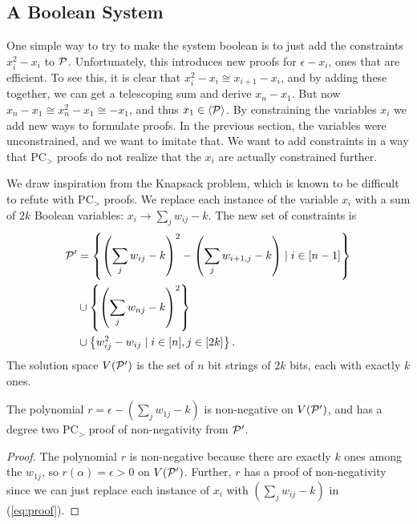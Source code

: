 \subsection{A Boolean System}
One simple way to try to make the system boolean is to just add the constraints $x_i^2 - x_i$ to $\mathcal P$. Unfortunately, this introduces new proofs for $\epsilon - x_i$, ones that are efficient. To see this, it is clear that $x_i^2 - x_i \cong x_{i+1} - x_i$, and by adding these together, we can get a telescoping sum and derive $x_n - x_1$. But now $x_n - x_1 \cong x_n^2 - x_1 \cong -x_1$, and thus $x_1 \in \langle \mathcal P \rangle$. By constraining the variables $x_i$ we add new ways to formulate proofs. In the previous section, the variables were unconstrained, and we want to imitate that. We want to add constraints in a way that PC$_>$ proofs do not realize that the $x_i$ are actually constrained further.

We draw inspiration from the Knapsack problem, which is known to be difficult to refute with PC$_>$ proofs. We replace each instance of the variable $x_i$ with a sum of $2k$ Boolean variables: $x_i \rightarrow \sum_j w_{ij} - k$. The new set of constraints is
\begin{align*}
\mathcal P' &= \left\{\left(\sum_j w_{ij} - k\right)^2 - \left(\sum_j w_{i+1,j} - k\right) \mid i \in [n-1]\right\} \\
&\cup \left\{\left(\sum_j w_{nj} - k\right)^2 \right\} \\
&\cup \left\{w_{ij}^2 - w_{ij} \mid i \in [n], j \in [2k]\right\}.
\end{align*}
The solution space $V(\mathcal P')$ is the set of $n$ bit strings of $2k$ bits, each with exactly $k$ ones.
\begin{lemma}\label{lem:boolean-degtwoproof}
The polynomial $r = \epsilon - \left(\sum_j w_{1j} - k\right)$ is non-negative on $V(\mathcal P')$, and has a degree two PC$_>$ proof of non-negativity from $\mathcal P'$.
\end{lemma}
\begin{proof}
The polynomial $r$ is non-negative because there are exactly $k$ ones among the $w_{1j}$, so $r(\alpha) = \epsilon > 0$ on $V(\mathcal P')$.
Further, $r$ has a proof of non-negativity since we can just replace each instance of $x_i$ with $\left(\sum_j w_{ij} - k\right)$ in (\ref{eq:proof}). 
\end{proof}

